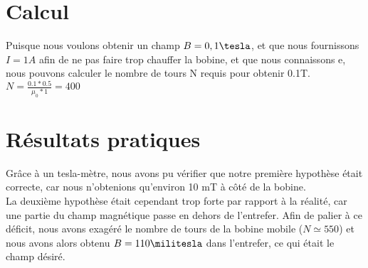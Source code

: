 \section{Calcul}
Puisque nous voulons obtenir un champ $B = 0,1 \tesla$, et que nous fournissons $I = 1 A$ afin de ne pas faire trop 
chauffer la bobine, et que nous connaissons e, nous pouvons calculer le nombre de tours N requis pour obtenir 0.1T.
$N = \frac{0.1 * 0.5}{\mu_0 * 1} = 400$
\section{Résultats pratiques}
Grâce à un tesla-mètre, nous avons pu vérifier que notre première hypothèse était correcte, car nous n'obtenions 
qu'environ 10 mT à côté de la bobine. 
\\La deuxième hypothèse était cependant trop forte par rapport à la réalité, car une 
partie du champ magnétique passe en dehors de l'entrefer. Afin de palier à ce déficit, nous avons exagéré le nombre de 
tours de la bobine mobile ($N \simeq 550$) et nous avons alors obtenu $B = 110 \militesla$ dans l'entrefer, 
ce qui était le champ désiré.       